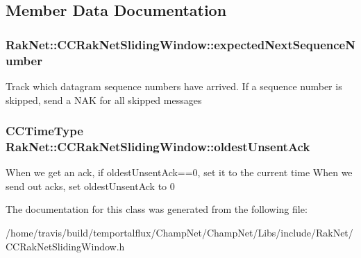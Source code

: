 \subsection{Member Data Documentation}
\hypertarget{class_rak_net_1_1_c_c_rak_net_sliding_window_aad7867d1a9fb971f16450dbb769c31ef}{
\subsubsection[{expected\-Next\-Sequence\-Number}]{ Rak\-Net\-::\-C\-C\-Rak\-Net\-Sliding\-Window\-::expected\-Next\-Sequence\-Number\hspace{0.3cm}{\ttfamily [protected]}}}\label{class_rak_net_1_1_c_c_rak_net_sliding_window_aad7867d1a9fb971f16450dbb769c31ef}
Track which datagram sequence numbers have arrived. If a sequence number is skipped, send a N\-A\-K for all skipped messages \hypertarget{class_rak_net_1_1_c_c_rak_net_sliding_window_addc3099db5884a308893f31429a6be28}{
\subsubsection[{oldest\-Unsent\-Ack}]{\setlength{\rightskip}{0pt plus 5cm}C\-C\-Time\-Type Rak\-Net\-::\-C\-C\-Rak\-Net\-Sliding\-Window\-::oldest\-Unsent\-Ack\hspace{0.3cm}{\ttfamily [protected]}}}\label{class_rak_net_1_1_c_c_rak_net_sliding_window_addc3099db5884a308893f31429a6be28}
When we get an ack, if oldest\-Unsent\-Ack==0, set it to the current time When we send out acks, set oldest\-Unsent\-Ack to 0 

The documentation for this class was generated from the following file\-:\begin{DoxyCompactItemize}
\item 
/home/travis/build/temportalflux/\-Champ\-Net/\-Champ\-Net/\-Libs/include/\-Rak\-Net/C\-C\-Rak\-Net\-Sliding\-Window.\-h\end{DoxyCompactItemize}
